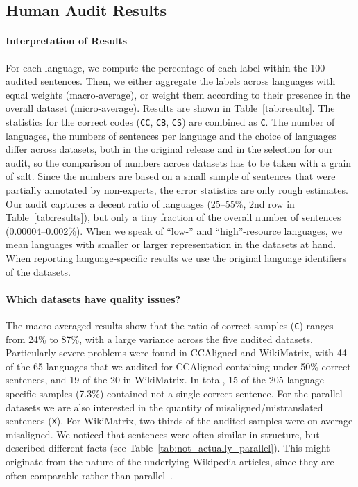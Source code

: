 \subsection{Human Audit Results}\label{sec:audit-res}


\paragraph{Interpretation of Results}
For each language, we compute the percentage of each label within the 100 audited sentences.
Then, we either aggregate the labels across languages with equal weights (macro-average), or weight them according to their presence in the overall dataset (micro-average). Results are shown in Table~\ref{tab:results}. The statistics for the correct codes (\texttt{CC}, \texttt{CB}, \texttt{CS}) are combined as \texttt{C}.
The number of languages, the numbers of sentences per language and the choice of languages differ across datasets, both in the original release and in the selection for our audit, so the comparison of numbers across datasets has to be taken with a grain of salt. Since the numbers are based on a small sample of sentences that were partially annotated by non-experts, the error statistics are only rough estimates.
Our audit captures a decent ratio of languages (25--55\%, 2nd row in Table~\ref{tab:results}), but only a tiny fraction of the overall number of sentences (0.00004--0.002\%).
When we speak of ``low-'' and ``high''-resource languages, we mean languages with smaller or larger representation in the datasets at hand. When reporting language-specific results we use the original language identifiers of the datasets.



\paragraph{Which datasets have quality issues?}

The macro-averaged results show that the ratio of correct samples (\texttt{C}) ranges from 24\% to 87\%, with a large variance across the five audited datasets.
Particularly severe problems were found in CCAligned and WikiMatrix, with 44 of the 65 languages that we audited for CCAligned containing under 50\% correct sentences, and 19 of the 20 in WikiMatrix. In total, 15 of the 205 language specific samples (7.3\%) contained not a single correct sentence.
For the parallel datasets we are also interested in the quantity of misaligned/mistranslated sentences (\texttt{X}). For WikiMatrix, two-thirds of the audited samples were on average misaligned. We noticed that sentences were often similar in structure, but described different facts (see Table~\ref{tab:not_actually_parallel}). This might originate from the nature of the underlying Wikipedia articles, since they are often comparable rather than parallel~\citep{schwenk-etal-2021-wikimatrix}.

